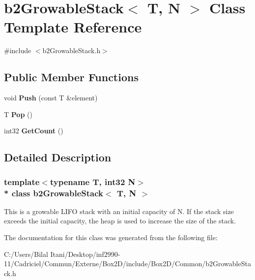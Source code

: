 \hypertarget{classb2_growable_stack}{}\section{b2\+Growable\+Stack$<$ T, N $>$ Class Template Reference}
\label{classb2_growable_stack}


{\ttfamily \#include $<$b2\+Growable\+Stack.\+h$>$}

\subsection*{Public Member Functions}
\begin{DoxyCompactItemize}
\item 
void {\bfseries Push} (const T \&element)\hypertarget{classb2_growable_stack_a23661327d64ff72d1ec8d6bcdb6d8992}{}\label{classb2_growable_stack_a23661327d64ff72d1ec8d6bcdb6d8992}

\item 
T {\bfseries Pop} ()\hypertarget{classb2_growable_stack_a53e53dcd6bff8308405a881f02957bc8}{}\label{classb2_growable_stack_a53e53dcd6bff8308405a881f02957bc8}

\item 
int32 {\bfseries Get\+Count} ()\hypertarget{classb2_growable_stack_a3049e76ba7182b988450bfe94d30d5aa}{}\label{classb2_growable_stack_a3049e76ba7182b988450bfe94d30d5aa}

\end{DoxyCompactItemize}


\subsection{Detailed Description}
\subsubsection*{template$<$typename T, int32 N$>$\\*
class b2\+Growable\+Stack$<$ T, N $>$}

This is a growable L\+I\+FO stack with an initial capacity of N. If the stack size exceeds the initial capacity, the heap is used to increase the size of the stack. 

The documentation for this class was generated from the following file\+:\begin{DoxyCompactItemize}
\item 
C\+:/\+Users/\+Bilal Itani/\+Desktop/inf2990-\/11/\+Cadriciel/\+Commun/\+Externe/\+Box2\+D/include/\+Box2\+D/\+Common/b2\+Growable\+Stack.\+h\end{DoxyCompactItemize}
